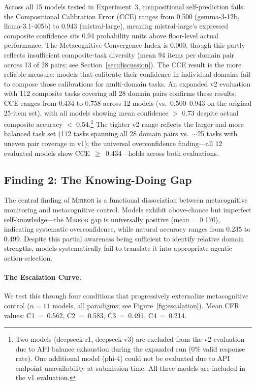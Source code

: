 \documentclass[10pt]{article}
\newcommand{\mirror}{\textsc{Mirror}}
\newcommand{\CCE}{CCE}
\newcommand{\CFR}{CFR}
\begin{document}
Across all 15 models tested in Experiment~3, compositional self-prediction fails:
the Compositional Calibration Error (\CCE{}) ranges from 0.500 (gemma-3-12b,
llama-3.1-405b) to 0.943 (mistral-large), meaning mistral-large's expressed
composite confidence sits 0.94 probability units above floor-level actual
performance. The Metacognitive Convergence Index is 0.000, though this partly
reflects insufficient composite-task diversity (mean 94 items per domain pair
across 13 of 28 pairs; see Section~\ref{sec:discussion}). The \CCE{} result is the more reliable measure: models that calibrate their
confidence in individual domains fail to compose those calibrations for
multi-domain tasks. An expanded v2 evaluation with 112 composite tasks covering all 28 domain pairs
confirms these results: CCE ranges from 0.434 to 0.758 across 12 models (vs.\
0.500--0.943 on the original 25-item set), with all models showing mean
confidence $>$ 0.73 despite actual composite accuracy $<$ 0.54.\footnote{Two models (deepseek-r1, deepseek-v3) are excluded from the v2 evaluation due to API balance exhaustion during the expanded run (0\% valid response rate). One additional model (phi-4) could not be evaluated due to API endpoint unavailability at submission time. All three models are included in the v1 evaluation.}
The tighter v2 range reflects the larger and more balanced task set (112 tasks spanning all 28 domain pairs vs.\ ${\sim}$25 tasks with uneven pair coverage in v1); the universal overconfidence finding---all 12 evaluated models show CCE~$\geq$~0.434---holds across both evaluations.

\subsection{Finding 2: The Knowing-Doing Gap}

The central finding of \mirror{} is a functional dissociation between metacognitive
monitoring and metacognitive control. Models exhibit above-chance but imperfect self-knowledge---the \mirror{} gap is
universally positive (mean = 0.170), indicating systematic overconfidence, while
natural accuracy ranges from 0.235 to 0.499. Despite this partial awareness being
sufficient to identify relative domain strengths, models systematically fail to
translate it into appropriate agentic action-selection.

\paragraph{The Escalation Curve.}
We test this through four conditions that progressively externalize metacognitive
control ($n = 11$ models, all paradigms; see Figure~\ref{fig:escalation}).
Mean \CFR{} values: C1~=~0.562, C2~=~0.583, C3~=~0.491, C4~=~0.214.
\end{document}
